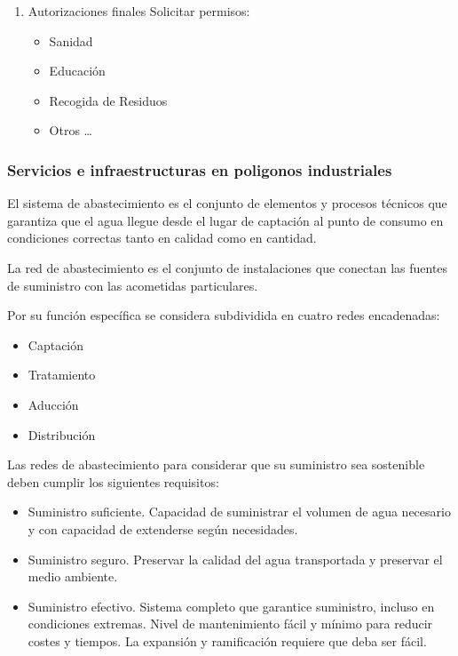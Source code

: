 \begin{enumerate}
\begin{itemize}
\begin{itemize}
            \item DE Instalaciones
        \end{itemize}
    \end{itemize}
    \item Autorizaciones finales
    Solicitar permisos:
    \begin{itemize}
        \item Sanidad
        \item Educación
        \item Recogida de Residuos
        \item Otros \dots
    \end{itemize}
\end{enumerate}

\subsubsection{Servicios e infraestructuras en poligonos industriales}

El sistema de abastecimiento es el conjunto de elementos y procesos técnicos que garantiza que el agua llegue desde el lugar de captación al punto de consumo en condiciones correctas tanto en calidad como en cantidad.

La red de abastecimiento es el conjunto de instalaciones que conectan las fuentes de suministro con las acometidas particulares.

Por su función específica se considera subdividida en cuatro redes encadenadas:
\begin{itemize}
    \item Captación
    \item Tratamiento
    \item Aducción
    \item Distribución
\end{itemize}

Las redes de abastecimiento para considerar que su suministro sea sostenible deben cumplir los siguientes requisitos:
\begin{itemize}
    \item Suministro suficiente. Capacidad de suministrar el volumen de agua necesario y con capacidad de extenderse según necesidades.
    \item Suministro seguro. Preservar la calidad del agua transportada y preservar el medio ambiente.
    \item Suministro efectivo. Sistema completo que garantice suministro, incluso en condiciones extremas. Nivel de mantenimiento fácil y mínimo para reducir costes y tiempos. La expansión y ramificación requiere que deba ser fácil.
\end{itemize}

